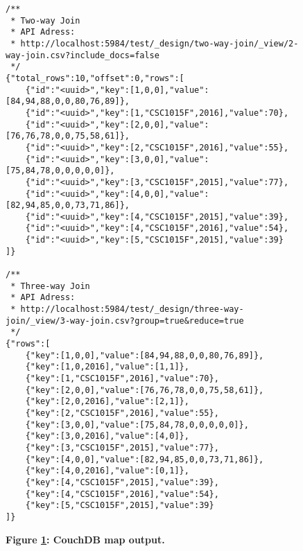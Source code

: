 \begin{figure}[H]
    \centering
    \begin{mdframed}[rightline=false,leftline=false]
        \begin{verbatim}
/**
 * Two-way Join
 * API Adress:
 * http://localhost:5984/test/_design/two-way-join/_view/2-way-join.csv?include_docs=false
 */
{"total_rows":10,"offset":0,"rows":[
    {"id":"<uuid>","key":[1,0,0],"value":[84,94,88,0,0,80,76,89]},
    {"id":"<uuid>","key":[1,"CSC1015F",2016],"value":70},
    {"id":"<uuid>","key":[2,0,0],"value":[76,76,78,0,0,75,58,61]},
    {"id":"<uuid>","key":[2,"CSC1015F",2016],"value":55},
    {"id":"<uuid>","key":[3,0,0],"value":[75,84,78,0,0,0,0,0]},
    {"id":"<uuid>","key":[3,"CSC1015F",2015],"value":77},
    {"id":"<uuid>","key":[4,0,0],"value":[82,94,85,0,0,73,71,86]},
    {"id":"<uuid>","key":[4,"CSC1015F",2015],"value":39},
    {"id":"<uuid>","key":[4,"CSC1015F",2016],"value":54},
    {"id":"<uuid>","key":[5,"CSC1015F",2015],"value":39}
]}

/**
 * Three-way Join
 * API Adress:
 * http://localhost:5984/test/_design/three-way-join/_view/3-way-join.csv?group=true&reduce=true
 */
{"rows":[
    {"key":[1,0,0],"value":[84,94,88,0,0,80,76,89]},
    {"key":[1,0,2016],"value":[1,1]},
    {"key":[1,"CSC1015F",2016],"value":70},
    {"key":[2,0,0],"value":[76,76,78,0,0,75,58,61]},
    {"key":[2,0,2016],"value":[2,1]},
    {"key":[2,"CSC1015F",2016],"value":55},
    {"key":[3,0,0],"value":[75,84,78,0,0,0,0,0]},
    {"key":[3,0,2016],"value":[4,0]},
    {"key":[3,"CSC1015F",2015],"value":77},
    {"key":[4,0,0],"value":[82,94,85,0,0,73,71,86]},
    {"key":[4,0,2016],"value":[0,1]},
    {"key":[4,"CSC1015F",2015],"value":39},
    {"key":[4,"CSC1015F",2016],"value":54},
    {"key":[5,"CSC1015F",2015],"value":39}
]}
        \end{verbatim}
    \end{mdframed}
    \caption[CouchDB map output]{\textbf{Figure \ref{fig-test-map-output}: CouchDB map output.}}
    \label{fig-test-map-output}
\end{figure}
